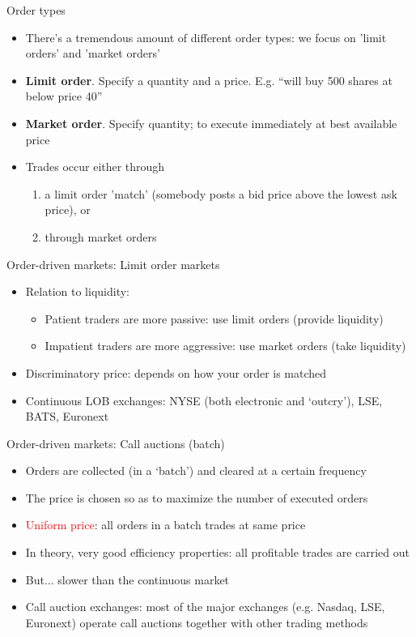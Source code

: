 \begin{frame}{Order types}
\begin{itemize}
	\item There's a tremendous amount of different order types: we focus on 'limit orders' and 'market orders'
	\item \textbf{Limit order}. Specify a quantity and a price. E.g. ``will buy 500 shares at below price 40''
	\item \textbf{Market order}. Specify quantity; to execute immediately at best available price
	\item Trades occur either through 
	\begin{enumerate}
		\item a limit order 'match' (somebody posts a bid price above the lowest ask price), or
		\item through market orders
	\end{enumerate}
\end{itemize}
\end{frame}


\begin{frame}{Order-driven markets: Limit order markets}
\begin{itemize}
	\item Relation to liquidity:
	\begin{itemize}
		\item Patient traders are more passive: use limit orders (provide liquidity)
		\item Impatient traders are more aggressive: use market orders (take liquidity)
	\end{itemize}
	\item \alert{Discriminatory price}: depends on how your order is matched
	\item Continuous LOB exchanges: NYSE (both electronic and `outcry'), LSE, BATS, Euronext
\end{itemize}
\end{frame}


\begin{frame}{Order-driven markets: Call auctions (batch)}
\begin{itemize}
	\item Orders are collected (in a `batch') and cleared at a certain frequency
	\item The price is chosen so as to maximize the number of executed orders
	\item \textcolor{red}{Uniform price}: all orders in a batch trades at same price
	\item In theory,  very good efficiency properties: all profitable trades are carried out
	\item But... slower than the continuous market
	\item Call auction exchanges: most of the major exchanges (e.g. Nasdaq, LSE, Euronext) operate call auctions together with other trading methods
\end{itemize}
\end{frame}


